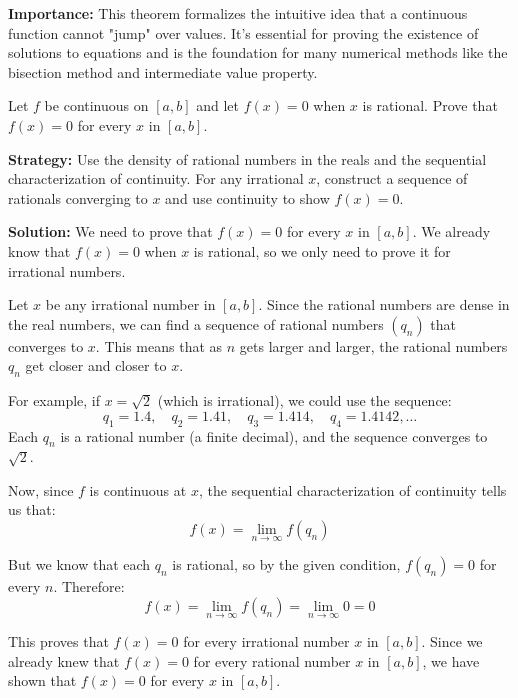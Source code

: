 \noindent\textbf{Importance:} This theorem formalizes the intuitive idea that a continuous function cannot "jump" over values. It's essential for proving the existence of solutions to equations and is the foundation for many numerical methods like the bisection method and intermediate value property.





\begin{problembox}
\begin{problemstatement}
Let \( f \) be continuous on \([a, b]\) and let \( f(x) = 0 \) when \( x \) is rational. Prove that \( f(x) = 0 \) for every \( x \) in \([a, b]\).
\end{problemstatement}
\end{problembox}

\noindent\textbf{Strategy:} Use the density of rational numbers in the reals and the sequential characterization of continuity. For any irrational $x$, construct a sequence of rationals converging to $x$ and use continuity to show $f(x) = 0$.

\bigskip\noindent\textbf{Solution:}
We need to prove that $f(x) = 0$ for every $x$ in $[a, b]$. We already know that $f(x) = 0$ when $x$ is rational, so we only need to prove it for irrational numbers.

Let $x$ be any irrational number in $[a, b]$. Since the rational numbers are dense in the real numbers, we can find a sequence of rational numbers $(q_n)$ that converges to $x$. This means that as $n$ gets larger and larger, the rational numbers $q_n$ get closer and closer to $x$.

For example, if $x = \sqrt{2}$ (which is irrational), we could use the sequence:
\[q_1 = 1.4, \quad q_2 = 1.41, \quad q_3 = 1.414, \quad q_4 = 1.4142, \ldots\]
Each $q_n$ is a rational number (a finite decimal), and the sequence converges to $\sqrt{2}$.

Now, since $f$ is continuous at $x$, the sequential characterization of continuity tells us that:
\[f(x) = \lim_{n \to \infty} f(q_n)\]

But we know that each $q_n$ is rational, so by the given condition, $f(q_n) = 0$ for every $n$. Therefore:
\[f(x) = \lim_{n \to \infty} f(q_n) = \lim_{n \to \infty} 0 = 0\]

This proves that $f(x) = 0$ for every irrational number $x$ in $[a, b]$. Since we already knew that $f(x) = 0$ for every rational number $x$ in $[a, b]$, we have shown that $f(x) = 0$ for every $x$ in $[a, b]$.

